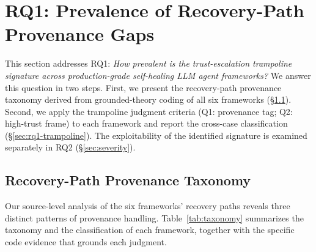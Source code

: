 
\section{RQ1: Prevalence of Recovery-Path Provenance Gaps}
\label{sec:results}

This section addresses RQ1: \emph{How prevalent is the trust-escalation trampoline signature across production-grade self-healing LLM agent frameworks?} We answer this question in two steps. First, we present the recovery-path provenance taxonomy derived from grounded-theory coding of all six frameworks (\S\ref{sec:rq1-taxonomy}). Second, we apply the trampoline judgment criteria (Q1: provenance tag; Q2: high-trust frame) to each framework and report the cross-case classification (\S\ref{sec:rq1-trampoline}). The exploitability of the identified signature is examined separately in RQ2 (\S\ref{sec:severity}).

\subsection{Recovery-Path Provenance Taxonomy}
\label{sec:rq1-taxonomy}

Our source-level analysis of the six frameworks' recovery paths reveals three distinct patterns of provenance handling. Table~\ref{tab:taxonomy} summarizes the taxonomy and the classification of each framework, together with the specific code evidence that grounds each judgment.

